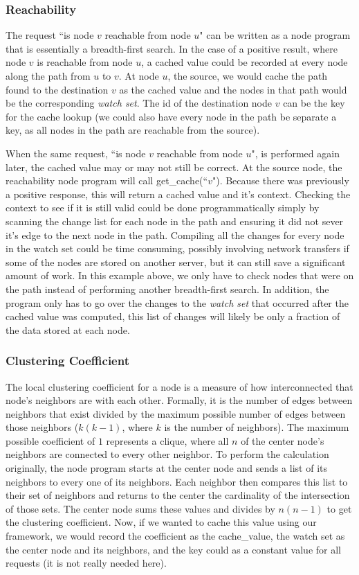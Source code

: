 \documentclass[letterpaper,twocolumn,11pt,tight]{article}
\begin{document}
\subsubsection{Reachability}
The request ``is node $v$ reachable from node $u$" can be written as a node program that is essentially a breadth-first search. In the case of a positive result, where node $v$ is reachable from node $u$, a cached value could be recorded at every node along the path from $u$ to $v$. At node $u$, the source, we would cache the path found to the destination $v$ as the cached value and the nodes in that path would be the corresponding \emph{watch set}. The id of the destination node $v$ can be the key for the cache lookup (we could also have every node in the path be separate a key, as all nodes in the path are reachable from the source). 

    When the same request, ``is node $v$ reachable from node $u$", is performed again later, the cached value may or may not still be correct. At the source node, the reachability node program will call get\_cache(``$v$"). Because there was previously a positive response, this will return a cached value and it's context. Checking the context to see if it is still valid could be done programmatically simply by scanning the change list for each node in the path and ensuring it did not sever it's edge to the next node in the path.
    Compiling all the changes for every node in the watch set could be time consuming, possibly involving network transfers if some of the nodes are stored on another server, but it can still save a significant amount of work. In this example above, we only have to check nodes that were on the path instead of performing another breadth-first search. In addition, the program only has to go over the changes to the \emph{watch set} that occurred after the cached value was computed, this list of changes will likely be only a fraction of the data stored at each node.

\subsubsection{Clustering Coefficient}\label{sec:clustering}
The local clustering coefficient for a node is a measure of how interconnected that node's neighbors are with each other. Formally, it is the number of edges between neighbors that exist divided by the maximum possible number of edges between those neighbors ($k(k-1)$, where $k$ is the number of neighbors).
The maximum possible coefficient of $1$ represents a clique, where all $n$ of the center node's neighbors are connected to every other neighbor.
To perform the calculation originally, the node program starts at the center node and sends a list of its neighbors to every one of its neighbors.
Each neighbor then compares this list to their set of neighbors and returns to the center the cardinality of the intersection of those sets.
The center node sums these values and divides by $n(n-1)$ to get the clustering coefficient. Now, if we wanted to cache this value using our framework, we would record the coefficient as the cache\_value, the watch set as the center node and its neighbors, and the key could as a constant value for all requests (it is not really needed here).
\end{document}
